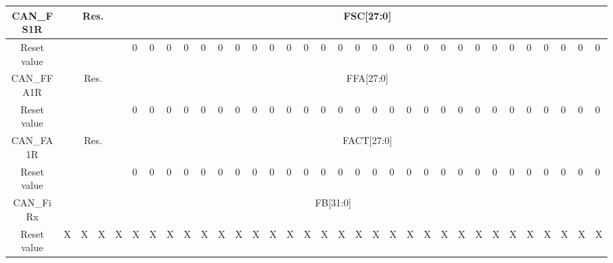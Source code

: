\begin{table}[H]
{\begin{tabular}{|c|c|l|l|l|l|l|l|l|l|l|l|l|l|l|l|l|l|l|l|l|l|l|l|l|l|l|l|l|l|l|l|l|}
		\hline
		CAN\_FS1R & \multicolumn{4}{c|}{Res.} & \multicolumn{28}{c|}{FSC[27:0]} \\
		\hline
		Reset value & & & & & 0 & 0 & 0 & 0 & 0 & 0 & 0 & 0 & 0 & 0 & 0 & 0 & 0 & 0 & 0 & 0 & 0 & 0 & 0 & 0 & 0 & 0 & 0 & 0 & 0 & 0 & 0 & 0 \\
		\hline
		CAN\_FFA1R & \multicolumn{4}{c|}{Res.} & \multicolumn{28}{c|}{FFA[27:0]} \\
		\hline
		Reset value & & & & & 0 & 0 & 0 & 0 & 0 & 0 & 0 & 0 & 0 & 0 & 0 & 0 & 0 & 0 & 0 & 0 & 0 & 0 & 0 & 0 & 0 & 0 & 0 & 0 & 0 & 0 & 0 & 0 \\
		\hline
		CAN\_FA1R & \multicolumn{4}{c|}{Res.} & \multicolumn{28}{c|}{FACT[27:0]} \\
		\hline
		Reset value & & & & & 0 & 0 & 0 & 0 & 0 & 0 & 0 & 0 & 0 & 0 & 0 & 0 & 0 & 0 & 0 & 0 & 0 & 0 & 0 & 0 & 0 & 0 & 0 & 0 & 0 & 0 & 0 & 0 \\
		\hline
		CAN\_FiRx & \multicolumn{32}{c|}{FB[31:0]} \\
		\hline
		Reset value & X & X & X & X & X & X & X & X & X & X & X & X & X & X & X & X & X & X & X & X & X & X & X & X & X & X & X & X & X & X & X & X \\
		\hline
	\end{tabular}%
	}
	\label{Tab:f407_dma_register_map_2}
\end{table}